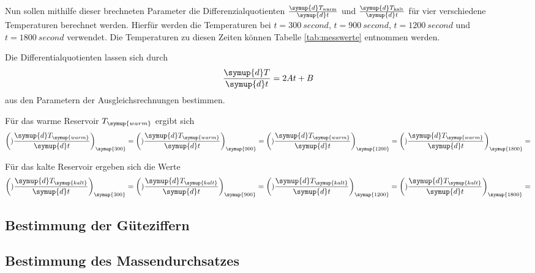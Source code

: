 Nun sollen mithilfe dieser brechneten Parameter die Differenzialquotienten
$\frac{\symup{d}T_\text{warm}}{\symup{d}t}$ und $\frac{\symup{d}T_\text{kalt}}{\symup{d}t}$ für
vier verschiedene Temperaturen berechnet werden. Hierfür werden die Temperaturen
bei $t=\SI{300}{second}$, $t=\SI{900}{second}$, $t=\SI{1200}{second}$ und
$t=\SI{1800}{second}$ verwendet. Die Temperaturen zu diesen Zeiten können Tabelle
\ref{tab:messwerte} entnommen werden.

Die Differentialquotienten lassen sich durch
\begin{equation}
  \frac{\symup{d}T}{\symup{d}t}=2At+B
\end{equation}
aus den Parametern der Ausgleichsrechnungen bestimmen.

Für das warme Reservoir $T_{\symup{warm}}$ ergibt sich
\begin{align*}
  \biggl()\frac{\symup{d}T_{\symup{warm}}}{\symup{d}t}\biggr)_{\symup{300}} =
  \biggl()\frac{\symup{d}T_{\symup{warm}}}{\symup{d}t}\biggr)_{\symup{900}} =
  \biggl()\frac{\symup{d}T_{\symup{warm}}}{\symup{d}t}\biggr)_{\symup{1200}} =
  \biggl()\frac{\symup{d}T_{\symup{warm}}}{\symup{d}t}\biggr)_{\symup{1800}} =
\end{align*}


Für das kalte Reservoir ergeben sich die Werte
\begin{align*}
  \biggl()\frac{\symup{d}T_{\symup{kalt}}}{\symup{d}t}\biggr)_{\symup{300}} =
  \biggl()\frac{\symup{d}T_{\symup{kalt}}}{\symup{d}t}\biggr)_{\symup{900}} =
  \biggl()\frac{\symup{d}T_{\symup{kalt}}}{\symup{d}t}\biggr)_{\symup{1200}} =
  \biggl()\frac{\symup{d}T_{\symup{kalt}}}{\symup{d}t}\biggr)_{\symup{1800}} =
\end{align*}

\subsection{Bestimmung der Güteziffern}

\subsection{Bestimmung des Massendurchsatzes}
